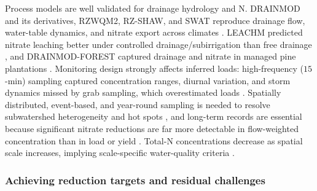 Process models are well validated for drainage hydrology and N. DRAINMOD
and its derivatives, RZWQM2, RZ-SHAW, and SWAT reproduce drainage flow,
water-table dynamics, and nitrate export across climates
\parencite{Youssef2018,Abdelbaki2025,Craft2018,Jiang2020,Tian2012,Mehan2019}.
LEACHM predicted nitrate leaching better under controlled
drainage/subirrigation than free drainage \parencite{Ng2000}, and
DRAINMOD-FOREST captured drainage and nitrate in managed pine plantations
\parencite{Tian2012}. Monitoring design strongly affects inferred loads:
high-frequency ($15$-min) sampling captured concentration ranges, diurnal
variation, and storm dynamics missed by grab sampling, which overestimated
loads \parencite{Drake2018}. Spatially distributed, event-based, and
year-round sampling is needed to resolve subwatershed heterogeneity and hot
spots \parencite{Irvine2019,Husk2024}, and long-term records are essential
because significant nitrate reductions are far more detectable in
flow-weighted concentration than in load or yield \parencite{Danalatos2022,Ghane2016b}.
Total-N concentrations decrease as spatial scale increases, implying
scale-specific water-quality criteria \parencite{Lagzdins2012}.

\subsubsection{Achieving reduction targets and residual challenges}

